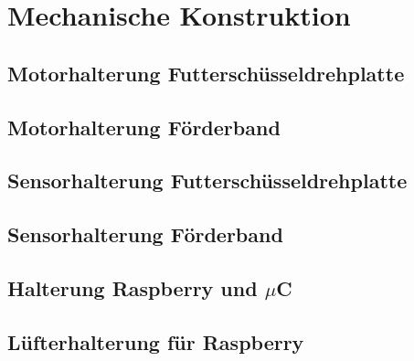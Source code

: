 \section{Mechanische Konstruktion}
\subsection{Motorhalterung Futterschüsseldrehplatte}
\subsection{Motorhalterung Förderband}
\subsection{Sensorhalterung Futterschüsseldrehplatte}
\subsection{Sensorhalterung Förderband}
\subsection{Halterung Raspberry und $\mu$C}
\subsection{Lüfterhalterung für Raspberry}
